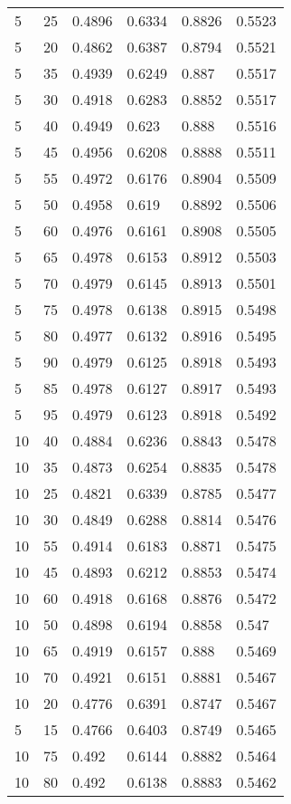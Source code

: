 \begin{center}
\begin{longtable}{|l|l|l|l|l|l|}
5  & 25 & 0.4896 & 0.6334 & 0.8826 & 0.5523 \\
5  & 20 & 0.4862 & 0.6387 & 0.8794 & 0.5521 \\
5  & 35 & 0.4939 & 0.6249 & 0.887  & 0.5517 \\
5  & 30 & 0.4918 & 0.6283 & 0.8852 & 0.5517 \\
5  & 40 & 0.4949 & 0.623  & 0.888  & 0.5516 \\
5  & 45 & 0.4956 & 0.6208 & 0.8888 & 0.5511 \\
5  & 55 & 0.4972 & 0.6176 & 0.8904 & 0.5509 \\
5  & 50 & 0.4958 & 0.619  & 0.8892 & 0.5506 \\
5  & 60 & 0.4976 & 0.6161 & 0.8908 & 0.5505 \\
5  & 65 & 0.4978 & 0.6153 & 0.8912 & 0.5503 \\
5  & 70 & 0.4979 & 0.6145 & 0.8913 & 0.5501 \\
5  & 75 & 0.4978 & 0.6138 & 0.8915 & 0.5498 \\
5  & 80 & 0.4977 & 0.6132 & 0.8916 & 0.5495 \\
5  & 90 & 0.4979 & 0.6125 & 0.8918 & 0.5493 \\
5  & 85 & 0.4978 & 0.6127 & 0.8917 & 0.5493 \\
5  & 95 & 0.4979 & 0.6123 & 0.8918 & 0.5492 \\
10 & 40 & 0.4884 & 0.6236 & 0.8843 & 0.5478 \\
10 & 35 & 0.4873 & 0.6254 & 0.8835 & 0.5478 \\
10 & 25 & 0.4821 & 0.6339 & 0.8785 & 0.5477 \\
10 & 30 & 0.4849 & 0.6288 & 0.8814 & 0.5476 \\
10 & 55 & 0.4914 & 0.6183 & 0.8871 & 0.5475 \\
10 & 45 & 0.4893 & 0.6212 & 0.8853 & 0.5474 \\
10 & 60 & 0.4918 & 0.6168 & 0.8876 & 0.5472 \\
10 & 50 & 0.4898 & 0.6194 & 0.8858 & 0.547  \\
10 & 65 & 0.4919 & 0.6157 & 0.888  & 0.5469 \\
10 & 70 & 0.4921 & 0.6151 & 0.8881 & 0.5467 \\
10 & 20 & 0.4776 & 0.6391 & 0.8747 & 0.5467 \\
5  & 15 & 0.4766 & 0.6403 & 0.8749 & 0.5465 \\
10 & 75 & 0.492  & 0.6144 & 0.8882 & 0.5464 \\
10 & 80 & 0.492  & 0.6138 & 0.8883 & 0.5462 \\

\end{longtable}
\end{center}
